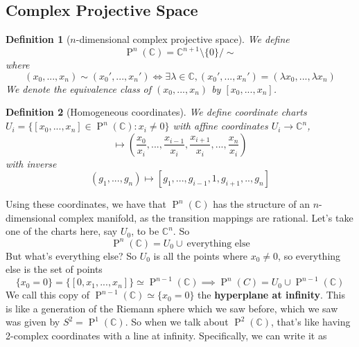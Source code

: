 \documentclass{article}
\newcommand{\mbb}[1]{\mathbb{#1}}
\newtheorem{definition}{Definition}
\DeclareMathOperator{\BigP}{P}
\newcommand{\Prj}[2]{\BigP^{#1}({#2})}
\begin{document}
\subsection{Complex Projective Space}

\begin{definition}[\(n\)-dimensional complex projective space]
We define
\begin{equation}\Prj{n}{\mbb{C}} = \mbb{C}^{n + 1} \setminus \{0\} / \sim\end{equation}
where
\begin{equation}(x_0,...,x_n) \sim (x_0',...,x_n') \iff \exists \lambda \in \mbb{C}, (x_0',...,x_n') = (\lambda x_0,..., \lambda x_n)\end{equation}
We denote the equivalence class of \((x_0,...,x_n)\) by \([x_0,...,x_n]\).
\end{definition}
\begin{definition}[Homogeneous coordinates]
We define coordinate charts \(U_i = \{[x_0, ..., x_n] \in \Prj{n}{\mbb{C}} : x_i \neq 0\}\) with affine coordinates \(U_i \to \mbb{C}^n\),
\begin{equation}[x_0,...,x_n] \mapsto \left(\frac{x_0}{x_i},...,\frac{x_{i - 1}}{x_i}, \frac{x_{i + 1}}{x_i},...,\frac{x_n}{x_i}\right)\end{equation}
with inverse
\begin{equation}(g_1,...,g_n) \mapsto [g_1,...,g_{i - 1}, 1, g_{i + 1},..,g_n]\end{equation}
\end{definition}
Using these coordinates, we have that \(\Prj{n}{\mbb{C}}\) has the structure of an \(n\)-dimensional complex manifold, as the transition mappings are rational. Let's take one of the charts here, say \(U_0\), to be \(\mbb{C}^n\). So
\begin{equation}\Prj{n}{\mbb{C}} = U_0 \cup \ \text{everything else}\end{equation}
But what's everything else? So \(U_0\) is all the points where \(x_0 \neq 0\), so everything else is the set of points
\begin{equation}\{x_0 = 0\} = \{[0, x_1,...,x_n]\} \simeq \Prj{n - 1}{\mbb{C}} \implies \Prj{n}{C} = U_0 \cup \Prj{n - 1}{\mbb{C}}\end{equation}
We call this copy of \(\Prj{n - 1}{\mbb{C}} \simeq \{x_0 = 0\}\) the \textbf{hyperplane at infinity}. This is like a generation of the Riemann sphere which we saw before, which we saw was given by \(S^2 = \Prj{1}{\mbb{C}}\). So when we talk about \(\Prj{2}{\mbb{C}}\), that's like having 2-complex coordinates with a line at infinity. Specifically, we can write it as
\end{document}
